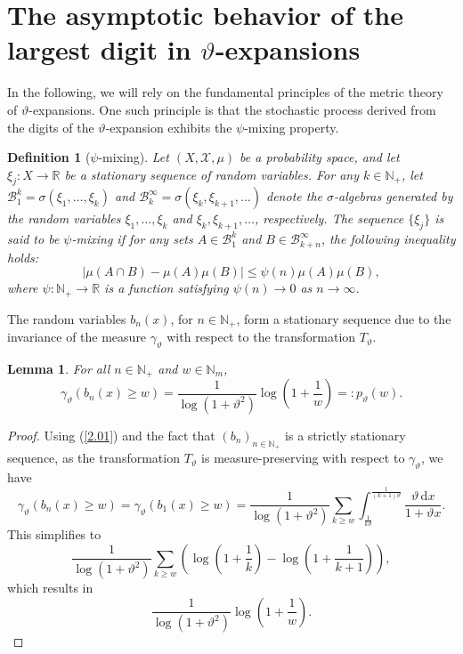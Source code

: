 \documentclass[final,1p,times]{elsarticle}
\newtheorem{lemma}[theorem]{Lemma}
\newtheorem{definition}[theorem]{Definition}
\numberwithin{equation}{section}
\begin{document}
\section{The asymptotic behavior of the largest digit in $\vartheta$-expansions}

In the following, we will rely on the fundamental principles of the metric theory of $\vartheta$-expansions. One such principle is that the stochastic process derived from the digits of the $\vartheta$-expansion exhibits the $\psi$-mixing property.

\begin{definition}[$\psi$-mixing] \label{def.4.1}
Let $(X, \mathcal{X}, \mu)$ be a probability space, and let $\xi_j : X \to \mathbb{R}$ be a stationary sequence of random variables. 
For any $k \in \mathbb{N}_+$, let $\mathcal{B}_1^k = \sigma(\xi_1, \dots, \xi_k)$ and 
$\mathcal{B}_k^\infty = \sigma(\xi_k, \xi_{k+1}, \dots)$ denote the $\sigma$-algebras generated by the random variables $\xi_1, \dots, \xi_k$ and $\xi_k, \xi_{k+1}, \dots$, respectively.
The sequence $\{\xi_j\}$ is said to be \textit{$\psi$-mixing} if for any sets $A \in \mathcal{B}_1^k$ and $B \in \mathcal{B}_{k+n}^\infty$, the following inequality holds:
\[
\left| \mu(A \cap B) - \mu(A) \mu(B) \right| \leq \psi(n) \mu(A) \mu(B),
\]
where $\psi : \mathbb{N}_+ \to \mathbb{R}$ is a function satisfying $\psi(n) \to 0$ as $n \to \infty$.
\end{definition}
%
The random variables $b_n(x)$, for $n \in \mathbb{N}_+$, form a stationary sequence due to the invariance of the measure $\gamma_{\vartheta}$ with respect to the transformation $T_{\vartheta}$.
%
%
%
%

\begin{lemma} \label{lema4.2}
For all \( n \in \mathbb{N}_+ \) and \( w \in \mathbb{N}_m \),
\[
\gamma_{\vartheta}(b_n(x) \geq w) = \frac{1}{\log(1+\vartheta^2)} \log\left( 1 + \frac{1}{w} \right) =: p_{\vartheta}(w).
\]
\end{lemma}

\begin{proof}
Using (\ref{2.01}) and the fact that \( (b_n)_{n \in \mathbb{N}_+} \) is a strictly stationary sequence, as the transformation \( T_{\vartheta} \) is measure-preserving with respect to \( \gamma_{\vartheta} \), we have
\[
\gamma_{\vartheta}(b_n(x) \geq w) = \gamma_{\vartheta}(b_1(x) \geq w) = \frac{1}{\log(1+\vartheta^2)} \sum_{k \geq w} \int_{\frac{1}{k \vartheta}}^{\frac{1}{(k+1) \vartheta}} \frac{\vartheta \, \mathrm{d}x}{1+\vartheta x}.
\]
This simplifies to
\[
\frac{1}{\log(1+\vartheta^2)} \sum_{k \geq w} \left( \log\left( 1 + \frac{1}{k} \right) - \log\left( 1 + \frac{1}{k+1} \right) \right),
\]
which results in
\[
\frac{1}{\log(1+\vartheta^2)} \log\left( 1 + \frac{1}{w} \right).
\]
\end{proof}
\end{document}
